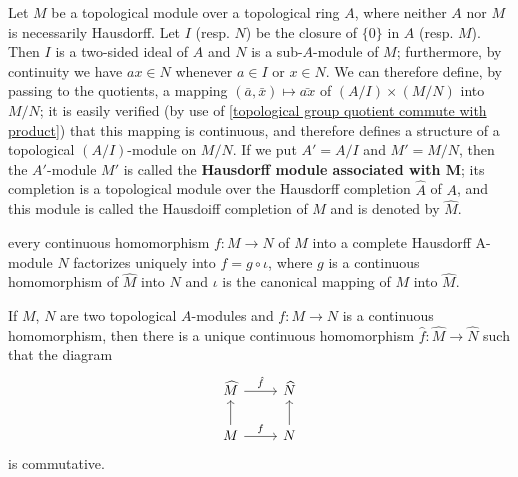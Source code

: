 Let $M$ be a topological module over a topological ring $A$, where neither $A$ nor $M$ is necessarily Hausdorff. Let $I$ (resp. $N$) be the closure of $\{0\}$ in $A$ (resp. $M$). Then $I$ is a two-sided ideal of $A$ and $N$ is a sub-$A$-module of $M$; furthermore, by continuity we have $ax\in N$ whenever $a\in I$ or $x\in N$. We can therefore define, by passing to the quotients, a mapping $(\bar{a},\bar{x})\mapsto\bar{ax}$ of $(A/I)\times(M/N)$ into $M/N$; it is easily verified (by use of \cref{topological group quotient commute with product}) that this mapping is continuous, and therefore defines a structure of a topological $(A/I)$-module on $M/N$. If we put $A'=A/I$ and $M'=M/N$, then the $A'$-module $M'$ is called the \textbf{Hausdorff module associated with $\bm{M}$}; its completion is a topological module over the Hausdorff completion $\widehat{A}$ of $A$, and this module is called the Hausdoiff completion of $M$ and is denoted by $\widehat{M}$.
\begin{proposition}
every continuous homomorphism $f:M\to N$ of $M$ into a complete Hausdorff A-module $N$ factorizes uniquely into $f=g\circ\iota$, where $g$ is a continuous homomorphism of $\widehat{M}$ into $N$ and $\iota$ is the canonical mapping of $M$ into $\widehat{M}$.
\end{proposition}
\begin{proposition}
If $M$, $N$ are two topological $A$-modules and $f:M\to N$ is a continuous homomorphism, then there is a unique continuous homomorphism $\hat{f}:\widehat{M}\to\widehat{N}$ such that the diagram
\[\begin{tikzcd}
\widehat{M}\ar[r,"\hat{f}"]&\widehat{N}\\
M\ar[u]\ar[r,"f"]&N\ar[u]
\end{tikzcd}\]
is commutative.
\end{proposition}
